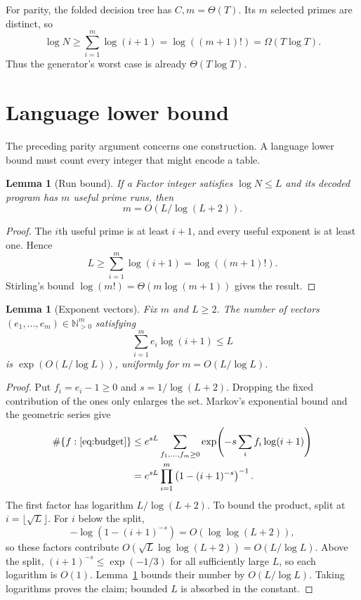 \documentclass[10pt]{article}
\newtheorem{lemma}[theorem]{Lemma}
\theoremstyle{remark}
\newcommand{\N}{\mathbb N}
\begin{document}
For parity, the folded decision tree has $C,m=\Theta(T)$.  Its $m$ selected
primes are distinct, so
\[
  \log N\ge\sum_{i=1}^{m}\log(i+1)=\log((m+1)!)=\Omega(T\log T).
\]
Thus the generator's worst case is already $\Theta(T\log T)$.

\section{Language lower bound}

The preceding parity argument concerns one construction.  A language lower
bound must count every integer that might encode a table.

\begin{lemma}[Run bound]\label{lem:runs}
If a Factor integer satisfies $\log N\le L$ and its decoded program has $m$
useful prime runs, then
\[
  m=O(L/\log(L+2)).
\]
\end{lemma}

\begin{proof}
The $i$th useful prime is at least $i+1$, and every useful exponent is at
least one.  Hence
\[
  L\ge\sum_{i=1}^{m}\log(i+1)=\log((m+1)!).
\]
Stirling's bound $\log(m!)=\Theta(m\log(m+1))$ gives the result.
\end{proof}

\begin{lemma}[Exponent vectors]\label{lem:vectors}
Fix $m$ and $L\ge2$.  The number of vectors
$(e_1,\ldots,e_m)\in\N_{>0}^m$ satisfying
\begin{equation}\label{eq:budget}
  \sum_{i=1}^{m}e_i\log(i+1)\le L
\end{equation}
is $\exp(O(L/\log L))$, uniformly for
$m=O(L/\log L)$.
\end{lemma}

\begin{proof}
Put $f_i=e_i-1\ge0$ and $s=1/\log(L+2)$.  Dropping the fixed contribution
of the ones only enlarges the set.  Markov's exponential bound and the
geometric series give
\begin{align}
 \#\{f:\text{\eqref{eq:budget}}\}
 &\le e^{sL}
       \sum_{f_1,\ldots,f_m\ge0}
       \exp\!\left(-s\sum_i f_i\log(i+1)\right)\\
 &=e^{sL}\prod_{i=1}^{m}
       \left(1-(i+1)^{-s}\right)^{-1}.
\end{align}
The first factor has logarithm $L/\log(L+2)$.  To bound the product, split
at $i=\lfloor\sqrt L\rfloor$.  For $i$ below the split,
\[
 -\log\left(1-(i+1)^{-s}\right)=O(\log\log(L+2)),
\]
so these factors contribute
$O(\sqrt L\log\log(L+2))=O(L/\log L)$.  Above the split,
$(i+1)^{-s}\le\exp(-1/3)$ for all sufficiently large $L$, so each logarithm
is $O(1)$.  Lemma~\ref{lem:runs} bounds their number by $O(L/\log L)$.
Taking logarithms proves the claim; bounded $L$ is absorbed in the constant.
\end{proof}
\end{document}
